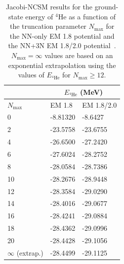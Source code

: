 \begin{table}[t!]
    \begin{center}
        \begin{tabular}{ m{2.5cm} || m{2.5cm} | m{2.5cm} }
                               & \multicolumn{2}{c}{$E_{{}^{4}{\text{He}}}$ (MeV)}              \\
            \hline
            $N_{\text{max}}$   & EM 1.8                                            & EM 1.8/2.0 \\
            \hline
            0                  & -8.81320                                          & -8.6427    \\
            2                  & -23.5758                                          & -23.6755   \\
            4                  & -26.6500                                          & -27.2420   \\
            6                  & -27.6024                                          & -28.2752   \\
            8                  & -28.0584                                          & -28.7386   \\
            10                 & -28.2676                                          & -28.9448   \\
            12                 & -28.3584                                          & -29.0290   \\
            14                 & -28.4016                                          & -29.0677   \\
            16                 & -28.4241                                          & -29.0884   \\
            18                 & -28.4362                                          & -29.0996   \\
            20                 & -28.4428                                          & -29.1056   \\
            \hline
            $\infty$ (extrap.) & -28.4499                                          & -29.1125   \\
        \end{tabular}
    \end{center}
    \caption[
        Jacobi-NCSM results for the ground-state energy of ${}^{4}\text{He}$
        as a function of the truncation parameter $N_{\text{max}}$ for
        the NN-only EM 1.8 potential and the NN+3N EM 1.8/2.0 potential.
        $N_{\text{max}} = \infty$ values are based on an exponential extrapolation
        using the values of $E_{{}^4\text{He}}$ for $N_{\text{max}} \ge 12$.
    ]{
        Jacobi-NCSM results for the ground-state energy of ${}^{4}\text{He}$
        as a function of the truncation parameter $N_{\text{max}}$ for
        the NN-only EM 1.8 potential and the NN+3N EM 1.8/2.0 potential~\cite{Hebe20jac_nscm_he4}.
        $N_{\text{max}} = \infty$ values are based on an exponential extrapolation
        using the values of $E_{{}^4\text{He}}$ for $N_{\text{max}} \ge 12$.
    }\label{tab:ncsm_he4_results}
\end{table}


